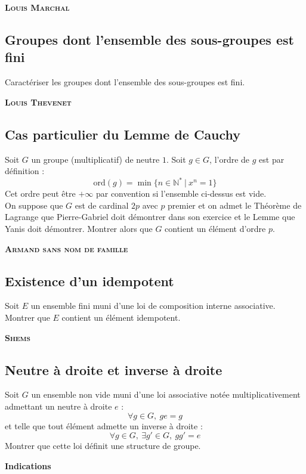 \documentclass[17pt]{article}
\def\N{\mathbb N}
\begin{document}
	\begin{center}
		\bfseries\Large\textsc{Louis Marchal}
	\end{center}
	\subsection*{Groupes dont l'ensemble des sous-groupes est fini}
		Caractériser les groupes dont l'ensemble des sous-groupes est fini.

	\begin{center}
		\bfseries\Large\textsc{Louis Thevenet}
	\end{center}
	\subsection*{Cas particulier du Lemme de Cauchy}
		Soit $G$ un groupe (multiplicatif) de neutre $1$. Soit $g\in G$, l'ordre de $g$ est par définition : \[\text{ord}(g)=\min\lbrace n\in\N^*\ | \ x^n=1\rbrace\]
		Cet ordre peut être $+\infty$ par convention si l'ensemble ci-dessus est vide.\\
		On suppose que $G$ est de cardinal $2p$ avec $p$ premier et on admet le Théorème de Lagrange que Pierre-Gabriel doit démontrer dans son exercice et le Lemme que Yanis doit démontrer. Montrer alors que $G$ contient un élément d'ordre $p$.

	\newpage
	\begin{center}
		\bfseries\Large\textsc{Armand sans nom de famille}
	\end{center}
	\subsection*{Existence d'un idempotent}
	Soit $E$ un ensemble fini muni d'une loi de composition interne associative. Montrer que $E$ contient un élément idempotent.

	\begin{center}
		\bfseries\Large\textsc{Shems}
	\end{center}
	\subsection*{Neutre à droite et inverse à droite}
	Soit $G$ un ensemble non vide muni d'une loi associative notée multiplicativement admettant un neutre à droite $e$ : \[\forall g\in G,\ ge=g\]
	et telle que tout élément admette un inverse à droite : \[\forall g\in G,\ \exists g'\in G,\ gg'=e\]
	Montrer que cette loi définit une structure de groupe.
	\newpage
	\begin{center}
		\Large\bfseries Indications
	\end{center}
\end{document}
